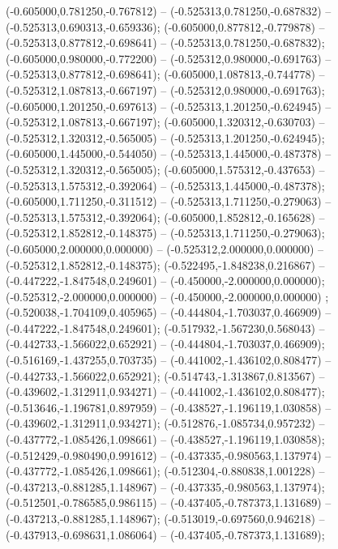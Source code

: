  (-0.605000,0.781250,-0.767812) -- (-0.525313,0.781250,-0.687832) -- (-0.525313,0.690313,-0.659336);
 (-0.605000,0.877812,-0.779878) -- (-0.525313,0.877812,-0.698641) -- (-0.525313,0.781250,-0.687832);
 (-0.605000,0.980000,-0.772200) -- (-0.525312,0.980000,-0.691763) -- (-0.525313,0.877812,-0.698641);
 (-0.605000,1.087813,-0.744778) -- (-0.525312,1.087813,-0.667197) -- (-0.525312,0.980000,-0.691763);
 (-0.605000,1.201250,-0.697613) -- (-0.525313,1.201250,-0.624945) -- (-0.525312,1.087813,-0.667197);
 (-0.605000,1.320312,-0.630703) -- (-0.525312,1.320312,-0.565005) -- (-0.525313,1.201250,-0.624945);
 (-0.605000,1.445000,-0.544050) -- (-0.525313,1.445000,-0.487378) -- (-0.525312,1.320312,-0.565005);
 (-0.605000,1.575312,-0.437653) -- (-0.525313,1.575312,-0.392064) -- (-0.525313,1.445000,-0.487378);
 (-0.605000,1.711250,-0.311512) -- (-0.525313,1.711250,-0.279063) -- (-0.525313,1.575312,-0.392064);
 (-0.605000,1.852812,-0.165628) -- (-0.525312,1.852812,-0.148375) -- (-0.525313,1.711250,-0.279063);
 (-0.605000,2.000000,0.000000) -- (-0.525312,2.000000,0.000000) -- (-0.525312,1.852812,-0.148375);
 (-0.522495,-1.848238,0.216867) -- (-0.447222,-1.847548,0.249601) -- (-0.450000,-2.000000,0.000000);
 (-0.525312,-2.000000,0.000000) -- (-0.450000,-2.000000,0.000000) ;
 (-0.520038,-1.704109,0.405965) -- (-0.444804,-1.703037,0.466909) -- (-0.447222,-1.847548,0.249601);
 (-0.517932,-1.567230,0.568043) -- (-0.442733,-1.566022,0.652921) -- (-0.444804,-1.703037,0.466909);
 (-0.516169,-1.437255,0.703735) -- (-0.441002,-1.436102,0.808477) -- (-0.442733,-1.566022,0.652921);
 (-0.514743,-1.313867,0.813567) -- (-0.439602,-1.312911,0.934271) -- (-0.441002,-1.436102,0.808477);
 (-0.513646,-1.196781,0.897959) -- (-0.438527,-1.196119,1.030858) -- (-0.439602,-1.312911,0.934271);
 (-0.512876,-1.085734,0.957232) -- (-0.437772,-1.085426,1.098661) -- (-0.438527,-1.196119,1.030858);
 (-0.512429,-0.980490,0.991612) -- (-0.437335,-0.980563,1.137974) -- (-0.437772,-1.085426,1.098661);
 (-0.512304,-0.880838,1.001228) -- (-0.437213,-0.881285,1.148967) -- (-0.437335,-0.980563,1.137974);
 (-0.512501,-0.786585,0.986115) -- (-0.437405,-0.787373,1.131689) -- (-0.437213,-0.881285,1.148967);
 (-0.513019,-0.697560,0.946218) -- (-0.437913,-0.698631,1.086064) -- (-0.437405,-0.787373,1.131689);
